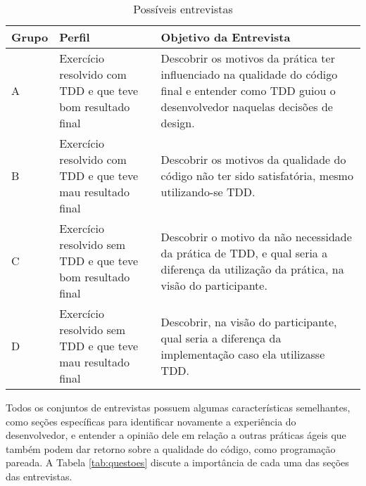 \begin{table}[h!]
	\begin{tabular}{ | p{2cm} | p{5cm} | p{7cm} |}
		\hline
		Grupo & Perfil & Objetivo da Entrevista \\ \hline
		
		A & Exercício resolvido com TDD e que teve bom resultado final
		& 
		Descobrir os motivos da prática ter influenciado na qualidade do código final e
		entender como TDD guiou o desenvolvedor naquelas decisões de design.
		
		\\ \hline
		
		B & Exercício resolvido com TDD e que teve mau resultado final
		&
		Descobrir os motivos da qualidade do código não ter sido satisfatória,
		mesmo utilizando-se TDD.
		
		\\ \hline
			
		C & Exercício resolvido sem TDD e que teve bom resultado final
		&
		Descobrir o motivo da não necessidade da prática de TDD, e qual seria a diferença
		da utilização da prática, na visão do participante.
		
		\\ \hline
		
		D & Exercício resolvido sem TDD e que teve mau resultado final
		&
		Descobrir, na visão do participante, qual seria a diferença da implementação
		caso ela utilizasse TDD.
		
		\\ \hline
		
	\end{tabular}
	\caption{Possíveis entrevistas}
	\label{tab:possiveis-entrevistas}
\end{table}

Todos os conjuntos de entrevistas possuem algumas características semelhantes,
como seções específicas para identificar novamente a experiência do desenvolvedor,
e entender a opinião dele em relação a outras práticas ágeis que também podem
dar retorno sobre a qualidade do código, como programação pareada. A Tabela \ref{tab:questoes}
discute a importância de cada uma das seções das entrevistas.


